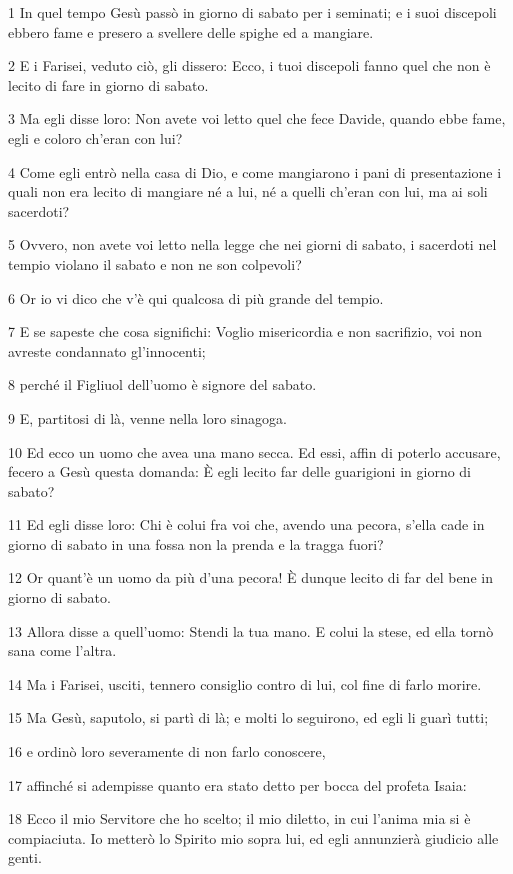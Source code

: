 \par 1 In quel tempo Gesù passò in giorno di sabato per i seminati; e i suoi discepoli ebbero fame e presero a svellere delle spighe ed a mangiare.
\par 2 E i Farisei, veduto ciò, gli dissero: Ecco, i tuoi discepoli fanno quel che non è lecito di fare in giorno di sabato.
\par 3 Ma egli disse loro: Non avete voi letto quel che fece Davide, quando ebbe fame, egli e coloro ch'eran con lui?
\par 4 Come egli entrò nella casa di Dio, e come mangiarono i pani di presentazione i quali non era lecito di mangiare né a lui, né a quelli ch'eran con lui, ma ai soli sacerdoti?
\par 5 Ovvero, non avete voi letto nella legge che nei giorni di sabato, i sacerdoti nel tempio violano il sabato e non ne son colpevoli?
\par 6 Or io vi dico che v'è qui qualcosa di più grande del tempio.
\par 7 E se sapeste che cosa significhi: Voglio misericordia e non sacrifizio, voi non avreste condannato gl'innocenti;
\par 8 perché il Figliuol dell'uomo è signore del sabato.
\par 9 E, partitosi di là, venne nella loro sinagoga.
\par 10 Ed ecco un uomo che avea una mano secca. Ed essi, affin di poterlo accusare, fecero a Gesù questa domanda: È egli lecito far delle guarigioni in giorno di sabato?
\par 11 Ed egli disse loro: Chi è colui fra voi che, avendo una pecora, s'ella cade in giorno di sabato in una fossa non la prenda e la tragga fuori?
\par 12 Or quant'è un uomo da più d'una pecora! È dunque lecito di far del bene in giorno di sabato.
\par 13 Allora disse a quell'uomo: Stendi la tua mano. E colui la stese, ed ella tornò sana come l'altra.
\par 14 Ma i Farisei, usciti, tennero consiglio contro di lui, col fine di farlo morire.
\par 15 Ma Gesù, saputolo, si partì di là; e molti lo seguirono, ed egli li guarì tutti;
\par 16 e ordinò loro severamente di non farlo conoscere,
\par 17 affinché si adempisse quanto era stato detto per bocca del profeta Isaia:
\par 18 Ecco il mio Servitore che ho scelto; il mio diletto, in cui l'anima mia si è compiaciuta. Io metterò lo Spirito mio sopra lui, ed egli annunzierà giudicio alle genti.
